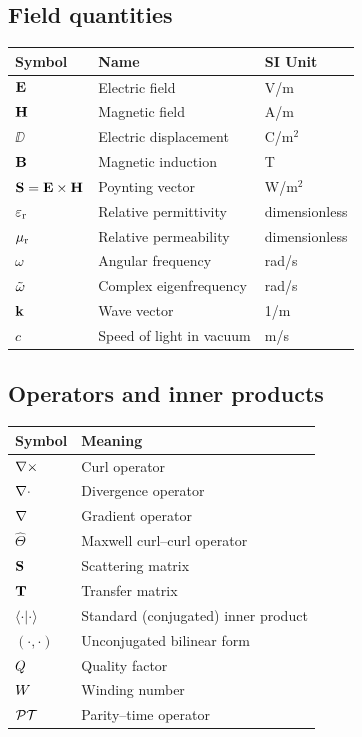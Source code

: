 \subsection{Field quantities}
\begin{center}
\begin{tabular}{lll}
\toprule
Symbol & Name & SI Unit \\
\midrule
$\mathbf{E}$ & Electric field & V/m \\
$\mathbf{H}$ & Magnetic field & A/m \\
$\DD$ & Electric displacement & C/m$^2$ \\
$\mathbf{B}$ & Magnetic induction & T \\
$\mathbf{S} = \mathbf{E}\times\mathbf{H}$ & Poynting vector & W/m$^2$ \\
$\varepsilon_{\mathrm{r}}$ & Relative permittivity & dimensionless \\
$\mu_{\mathrm{r}}$ & Relative permeability & dimensionless \\
$\omega$ & Angular frequency & rad/s \\
$\tilde{\omega}$ & Complex eigenfrequency & rad/s \\
$\mathbf{k}$ & Wave vector & 1/m \\
$c$ & Speed of light in vacuum & m/s \\
\bottomrule
\end{tabular}
\end{center}

\subsection{Operators and inner products}
\begin{center}
\begin{tabular}{ll}
\toprule
Symbol & Meaning \\
\midrule
$\nabla\times$ & Curl operator \\
$\nabla\cdot$ & Divergence operator \\
$\nabla$ & Gradient operator \\
$\hat{\Theta}$ & Maxwell curl--curl operator \\
$\mathbf{S}$ & Scattering matrix \\
$\mathbf{T}$ & Transfer matrix \\
$\langle\cdot|\cdot\rangle$ & Standard (conjugated) inner product \\
$(\cdot,\cdot)$ & Unconjugated bilinear form \\
$Q$ & Quality factor \\
$W$ & Winding number \\
$\mathcal{PT}$ & Parity--time operator \\
\bottomrule
\end{tabular}
\end{center}


